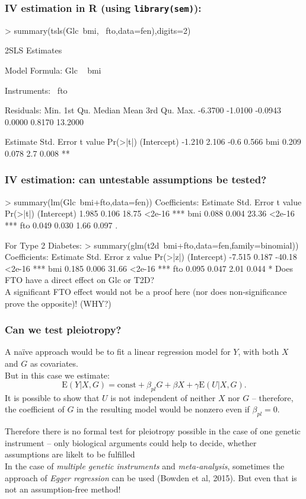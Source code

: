 \documentclass{beamer}
\newcommand{\code}[1]{\texttt{#1}}
\newcommand{\E}{\mathrm{E}}
\let\overbatim\verbatim
\let\endoverbatim\endverbatim
\newenvironment{vcode}%
{\bgroup\baselineskip=0.8\baselineskip\overbatim}%
{\endoverbatim\egroup}
\begin{document}
\begin{frame}[fragile]
\frametitle{IV estimation in R (using \code{library(sem)}):}
\small
\begin{vcode}
> summary(tsls(Glc~bmi, ~fto,data=fen),digits=2)

 2SLS Estimates

Model Formula: Glc ~ bmi

Instruments: ~fto

Residuals:
   Min. 1st Qu.  Median    Mean 3rd Qu.    Max. 
-6.3700 -1.0100 -0.0943  0.0000  0.8170 13.2000 

            Estimate Std. Error t value Pr(>|t|)   
(Intercept)   -1.210      2.106    -0.6    0.566   
bmi            0.209      0.078     2.7    0.008 **
\end{vcode}
\normalsize
\end{frame}

\begin{frame}[fragile]
\frametitle{IV estimation: can untestable assumptions be tested?}
\small
\begin{vcode}
> summary(lm(Glc~bmi+fto,data=fen))
Coefficients:
            Estimate Std. Error t value Pr(>|t|)    
(Intercept) 1.985  0.106   18.75   <2e-16 ***
bmi         0.088  0.004   23.36   <2e-16 ***
fto         0.049  0.030    1.66    0.097 .  

For Type 2 Diabetes:
> summary(glm(t2d~bmi+fto,data=fen,family=binomial))
Coefficients:
             Estimate Std. Error z value Pr(>|z|)    
(Intercept) -7.515   0.187  -40.18   <2e-16 ***
bmi          0.185   0.006   31.66   <2e-16 ***
fto          0.095   0.047    2.01    0.044 *  
\end{vcode}
\normalsize
Does FTO have a direct effect on Glc or T2D?  \\
\alert{A significant FTO effect would not be a proof here (nor does non-significance prove the opposite)! (WHY?)}
\end{frame}


\begin{frame}
\frametitle{Can we test pleiotropy?}
A na\"{i}ve approach would be to fit a linear regression model for $Y$, with both $X$ and $G$ as covariates.
\\
But in this case we estimate: 
\[
\E(Y|X, G) = \mbox{const} + \beta_{pl} G + \beta  X + \gamma \E(U|X, G).  
\]
It is possible to show that $U$ is not independent of neither $X$ nor $G$ -- therefore, the coefficient of $G$ in the resulting model would be nonzero even if $\beta_{pl}=0$.

\alert{Therefore there is no formal test for pleiotropy possible in the case of one genetic instrument -- only biological arguments could help to decide, whether assumptions are likelt to be fulfilled} \\
In the case of \emph{multiple genetic instruments} and \emph{meta-analysis}, sometimes the approach of \emph{Egger regression} can be used (Bowden et al, 2015). But even that is not an assumption-free method!
\end{frame}
\end{document}
